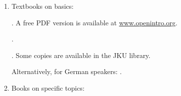 \documentclass[]{article}
\begin{document}
\begin{enumerate}
\def\labelenumi{\arabic{enumi}.}
\item
  Textbooks on basics:

  . A free PDF version is available at
  \href{https://www.openintro.org}{www.openintro.org}.

  .

  . Some copies are available in the JKU library.

  Alternatively, for German speakers: .
\item
  Books on specific topics:







\end{enumerate}
\end{document}
